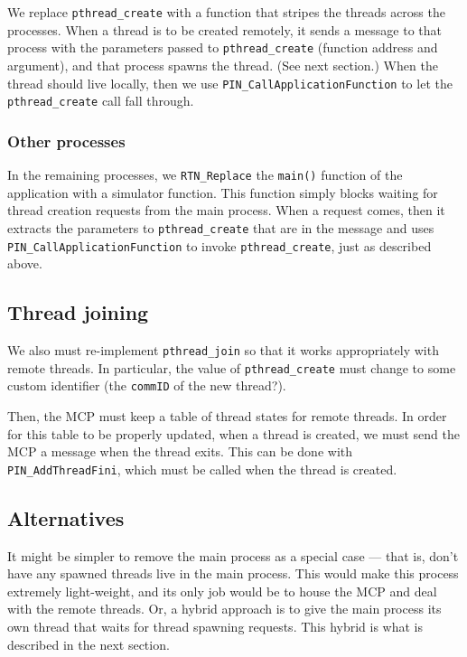 \documentclass[10pt,twocolumn]{article}
\begin{document}
We replace \texttt{pthread\_create} with a function that stripes the
threads across the processes. When a thread is to be created remotely,
it sends a message to that process with the parameters passed to
\texttt{pthread\_create} (function address and argument), and that
process spawns the thread. (See next section.) When the thread should
live locally, then we use \texttt{PIN\_CallApplicationFunction} to let
the \texttt{pthread\_create} call fall through.

\subsubsection{Other processes}
\label{sec:other-processes}

In the remaining processes, we \texttt{RTN\_Replace} the
\texttt{main()} function of the application with a simulator
function. This function simply blocks waiting for thread creation
requests from the main process. When a request comes, then it extracts
the parameters to \texttt{pthread\_create} that are in the message and
uses \texttt{PIN\_CallApplicationFunction} to invoke
\texttt{pthread\_create}, just as described above.

\subsection{Thread joining}
\label{sec:joining}

We also must re-implement \texttt{pthread\_join} so that it works
appropriately with remote threads. In particular, the value of
\texttt{pthread\_create} must change to some custom identifier (the
\texttt{commID} of the new thread?).

Then, the MCP must keep a table of thread states for remote
threads. In order for this table to be properly updated, when a thread
is created, we must send the MCP a message when the thread exits. This
can be done with \texttt{PIN\_AddThreadFini}, which must be called when
the thread is created.

\subsection{Alternatives}
\label{sec:alternatives}

It might be simpler to remove the main process as a special case ---
that is, don't have any spawned threads live in the main process. This
would make this process extremely light-weight, and its only job would
be to house the MCP and deal with the remote threads. Or, a hybrid
approach is to give the main process its own thread that waits for
thread spawning requests. This hybrid is what is described in the next
section.
\end{document}
